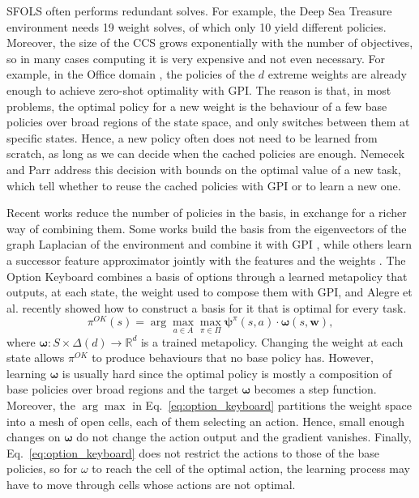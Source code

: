 \documentclass[11pt]{article}
\newcommand{\vpsi}{\bm{\psi}}      %
\newcommand{\vomega}{\bm{\omega}}  %
\begin{document}
SFOLS often performs redundant solves. For example, the Deep Sea Treasure environment \cite{cassimon_review_2024} needs 19 weight solves, of which only 10 yield different policies. Moreover, the size of the CCS grows exponentially with the number of objectives, so in many cases computing it is very expensive and not even necessary. For example, in the Office domain \cite{kuric_planning_2024}, the policies of the $d$ extreme weights are already enough to achieve zero-shot optimality with GPI. The reason is that, in most problems, the optimal policy for a new weight is the behaviour of a few base policies over broad regions of the state space, and only switches between them at specific states. Hence, a new policy often does not need to be learned from scratch, as long as we can decide when the cached policies are enough. Nemecek and Parr \cite{nemecek_policy_2021} address this decision with bounds on the optimal value of a new task, which tell whether to reuse the cached policies with GPI or to learn a new one.


Recent works reduce the number of policies in the basis, in exchange for a richer way of combining them. Some works build the basis from the eigenvectors of the graph Laplacian of the environment and combine it with GPI \cite{chandrasekar_towards_2025}, while others learn a successor feature approximator jointly with the features and the weights \cite{borsa_universal_2018,carvalho_combining_2023}. The Option Keyboard \cite{barreto_option_2021} combines a basis of options through a learned metapolicy that outputs, at each state, the weight used to compose them with GPI, and Alegre et al. \cite{alegre_constructing_2025} recently showed how to construct a basis for it that is optimal for every task.
\begin{equation}\label{eq:option_keyboard}
    \pi^{OK}(s) = \arg \max_{a \in A} \max_{\pi \in \Pi} \vpsi^{\pi}(s,a) \cdot \vomega(s, \mathbf{w}),
\end{equation}
where $\vomega: S \times \Delta(d) \to \mathbb{R}^d$ is a trained metapolicy. Changing the weight at each state allows $\pi^{OK}$ to produce behaviours that no base policy has. However, learning $\vomega$ is usually hard since the optimal policy is mostly a composition of base policies over broad regions and the target $\vomega$ becomes a step function. Moreover, the $\arg\max$ in Eq.~\eqref{eq:option_keyboard} partitions the weight space into a mesh of open cells, each of them selecting an action. Hence, small enough changes on $\vomega$ do not change the action output and the gradient vanishes. Finally, Eq.~\eqref{eq:option_keyboard} does not restrict the actions to those of the base policies, so for $\omega$ to reach the cell of the optimal action, the learning process may have to move through cells whose actions are not optimal.
\end{document}
